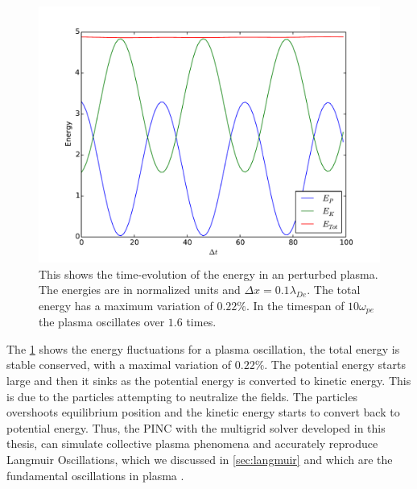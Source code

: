 		\begin{figure}
			\label{fig:oscillation}
			\includegraphics[width = \textwidth]{figures/verification/langmuirWave/energyPlot}
			\caption{This shows the time-evolution of the energy in an perturbed plasma. The energies are
			in normalized units and \(\Delta x = 0.1 \lambda_{De}\). The total energy has a maximum variation of \(0.22\%\). In the timespan
			of \(10\omega_{pe}\) the plasma oscillates over \(1.6\) times.}
		\end{figure}

		The \cref{fig:oscillation} shows the energy fluctuations for a plasma oscillation, the total energy
		is stable conserved, with a maximal variation of \(0.22\%\). The potential energy starts large
		and then it sinks as the potential energy is converted to kinetic energy. This is due to the particles
		attempting to neutralize the fields. The particles overshoots equilibrium position and the kinetic
		energy starts to convert back to potential energy. Thus, the PINC with the multigrid solver developed in this thesis,
		can simulate collective plasma phenomena and accurately reproduce Langmuir Oscillations, which we discussed in \cref{sec:langmuir} and
		which are the fundamental oscillations in plasma \citep{pecseli_waves_2012,chen_introduction_1984}.
 
